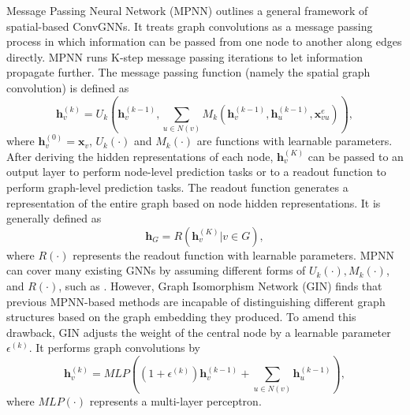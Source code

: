    
    
    
    Message Passing Neural Network (MPNN) \cite{gilmer2017neural} outlines a general framework of spatial-based ConvGNNs. It treats graph convolutions as a message passing process in which information can be passed from one node to another along edges directly. MPNN runs K-step message passing iterations to let information propagate further. The message passing function (namely the spatial graph convolution) is defined as
	\begin{equation}
	\mathbf{h}_v^{(k)} = U_k(\mathbf{h}_v^{(k-1)},\sum_{u\in N(v)} M_k(\mathbf{h}_v^{(k-1)},\mathbf{h}_u^{(k-1)},\mathbf{x}^e_{vu})),
	\end{equation}
	where $\mathbf{h}_v^{(0)}=\mathbf{x}_v$, $U_k(\cdot)$ and $M_k(\cdot)$ are functions with learnable parameters.  After deriving the hidden representations of each node, $\mathbf{h}_v^{(K)}$ can be passed to an output layer to perform node-level prediction tasks or to a readout function to perform graph-level prediction tasks.  The readout function generates a representation of the entire graph based on node hidden representations. It is generally defined as
	\begin{equation}
	\mathbf{h}_G = R({\mathbf{h}_v^{(K)}|v\in G}),
	\end{equation}
	where $R(\cdot)$ represents the readout function with learnable parameters. MPNN can cover many existing GNNs by assuming different forms of $U_k(\cdot),M_k(\cdot)$, and $R(\cdot)$, such as \cite{kipf2017semi, duvenaud2015convolutional,kearnes2016molecular,schutt2017quantum}. However, Graph Isomorphism Network (GIN) \cite{xu2019how} finds that previous MPNN-based methods are incapable of distinguishing different graph structures based on the graph embedding they produced. To amend this drawback,  GIN adjusts the weight of the central node by a learnable parameter $\epsilon^{(k)}$. It performs graph convolutions by
	\begin{equation}
	    \mathbf{h}_v^{(k)} = MLP((1+\epsilon^{(k)})\mathbf{h}_v^{(k-1)}+\sum_{u\in N(v)}\mathbf{h}_u^{(k-1)}),
	\end{equation}
    where $MLP(\cdot)$ represents a multi-layer perceptron.
    
